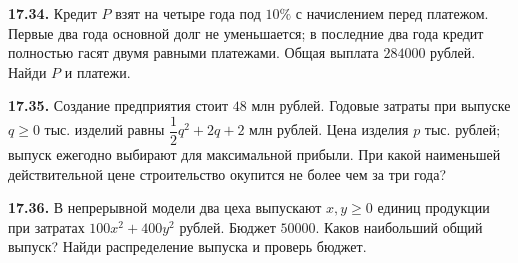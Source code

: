 \ifdim\dimexpr\ht\CatFlowBox+\dp\CatFlowBox\relax<58mm\dp\CatFlowBox=\dimexpr58mm-\ht\CatFlowBox\relax\fi%
\noindent\usebox{\CatFlowBox}\par\addvspace{2pt}

\noindent\begin{minipage}[t]{\linewidth}\textbf{17.34.}\starmark{} Кредит \(P\) взят на четыре года под \(10\%\) с начислением перед платежом. Первые два года основной долг не уменьшается; в последние два года кредит полностью гасят двумя равными платежами. Общая выплата \(284000\) рублей. Найди \(P\) и платежи.\par\end{minipage}\par
\noindent\begin{minipage}[t]{\linewidth}\textbf{17.35.}\starmark{} Создание предприятия стоит \(48\) млн рублей. Годовые затраты при выпуске \(q\ge0\) тыс. изделий равны \(\dfrac12q^2+2q+2\) млн рублей. Цена изделия \(p\) тыс. рублей; выпуск ежегодно выбирают для максимальной прибыли. При какой наименьшей действительной цене строительство окупится не более чем за три года?\par\end{minipage}\par
\noindent\begin{minipage}[t]{\linewidth}\textbf{17.36.}\starmark{} В непрерывной модели два цеха выпускают \(x,y\ge0\) единиц продукции при затратах \(100x^2+400y^2\) рублей. Бюджет \(50000\). Каков наибольший общий выпуск? Найди распределение выпуска и проверь бюджет.\par\end{minipage}\par
\endgroup
